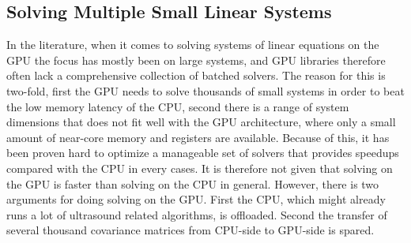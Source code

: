 \documentclass[12pt,journal,onecolumn]{IEEEtran}
\begin{document}

\subsection{Solving Multiple Small Linear Systems}
In the literature, when it comes to solving systems of linear equations on the GPU the focus has mostly been on large systems, and GPU libraries therefore often lack a comprehensive collection of batched solvers. The reason for this is two-fold, first the GPU needs to solve thousands of small systems in order to beat the low memory latency of the CPU, second there is a range of system dimensions that does not fit well with the GPU architecture, where only a small amount of near-core memory and registers are available. Because of this, it has been proven hard to optimize a manageable set of solvers that provides speedups compared with the CPU in every cases. It is therefore not given that solving on the GPU is faster than solving on the CPU in general. However, there is two arguments for doing solving on the GPU. First the CPU, which might already runs a lot of ultrasound related algorithms, is offloaded. Second the transfer of several thousand covariance matrices from CPU-side to GPU-side is spared.
\end{document}
